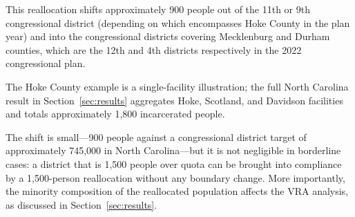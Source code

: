 This reallocation shifts approximately 900 people out of the 11th or
9th congressional district (depending on which encompasses Hoke County
in the plan year) and into the congressional districts covering Mecklenburg
and Durham counties, which are the 12th and 4th districts respectively
in the 2022 congressional plan.

The Hoke County example is a single-facility illustration; the full North
Carolina result in Section~\ref{sec:results} aggregates Hoke, Scotland, and
Davidson facilities and totals approximately 1,800 incarcerated people.

The shift is small---900 people against a congressional district target
of approximately 745,000 in North Carolina---but it is not negligible in
borderline cases: a district that is 1,500 people over quota can be brought
into compliance by a 1,500-person reallocation without any boundary change.
More importantly, the minority composition of the reallocated population
affects the VRA analysis, as discussed in Section~\ref{sec:results}.
